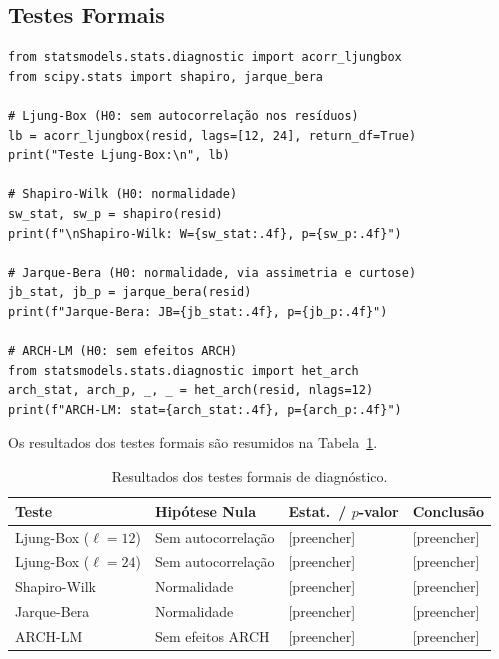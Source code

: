 \documentclass[12pt, a4paper]{article}
\begin{document}
\subsection{Testes Formais}

\begin{lstlisting}[caption={Testes formais de diagnóstico dos resíduos.},
                   label={lst:testes_resid}]
from statsmodels.stats.diagnostic import acorr_ljungbox
from scipy.stats import shapiro, jarque_bera

# Ljung-Box (H0: sem autocorrelação nos resíduos)
lb = acorr_ljungbox(resid, lags=[12, 24], return_df=True)
print("Teste Ljung-Box:\n", lb)

# Shapiro-Wilk (H0: normalidade)
sw_stat, sw_p = shapiro(resid)
print(f"\nShapiro-Wilk: W={sw_stat:.4f}, p={sw_p:.4f}")

# Jarque-Bera (H0: normalidade, via assimetria e curtose)
jb_stat, jb_p = jarque_bera(resid)
print(f"Jarque-Bera: JB={jb_stat:.4f}, p={jb_p:.4f}")

# ARCH-LM (H0: sem efeitos ARCH)
from statsmodels.stats.diagnostic import het_arch
arch_stat, arch_p, _, _ = het_arch(resid, nlags=12)
print(f"ARCH-LM: stat={arch_stat:.4f}, p={arch_p:.4f}")
\end{lstlisting}

Os resultados dos testes formais são resumidos na Tabela~\ref{tab:testes_resid}.

\begin{table}[H]
  \centering
  \caption{Resultados dos testes formais de diagnóstico.}
  \label{tab:testes_resid}
  \begin{tabularx}{\textwidth}{lXXX}
    \toprule
    \textbf{Teste} & \textbf{Hipótese Nula} & \textbf{Estat.\ / $p$-valor}
      & \textbf{Conclusão} \\
    \midrule
    Ljung-Box ($\ell=12$) & Sem autocorrelação  & [preencher] & [preencher] \\
    Ljung-Box ($\ell=24$) & Sem autocorrelação  & [preencher] & [preencher] \\
    Shapiro-Wilk          & Normalidade         & [preencher] & [preencher] \\
    Jarque-Bera           & Normalidade         & [preencher] & [preencher] \\
    ARCH-LM               & Sem efeitos ARCH    & [preencher] & [preencher] \\
    \bottomrule
  \end{tabularx}
\end{table}
\end{document}

